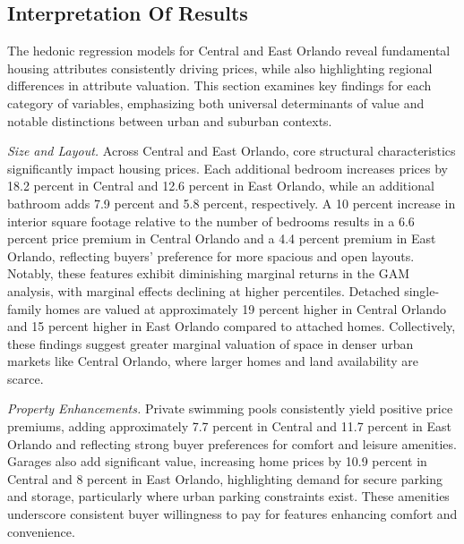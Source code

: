 




\subsection*{Interpretation Of Results}

The hedonic regression models for Central and East Orlando reveal fundamental housing attributes consistently driving prices, while also highlighting regional differences in attribute valuation. This section examines key findings for each category of variables, emphasizing both universal determinants of value and notable distinctions between urban and suburban contexts.

\textit{Size and Layout.}
Across Central and East Orlando, core structural characteristics significantly impact housing prices. Each additional bedroom increases prices by 18.2 percent  in Central and 12.6 percent in East Orlando, while an additional bathroom adds 7.9 percent and 5.8 percent, respectively. A 10 percent  increase in interior square footage relative to the number of bedrooms results in a 6.6 percent  price premium in Central Orlando and a 4.4 percent premium in East Orlando, reflecting buyers’ preference for more spacious and open layouts. Notably, these features exhibit diminishing marginal returns in the GAM analysis, with marginal effects declining at higher percentiles. Detached single-family homes are valued at approximately 19 percent higher in Central Orlando and 15 percent  higher in East Orlando compared to attached homes. Collectively, these findings suggest greater marginal valuation of space in denser urban markets like Central Orlando, where larger homes and land availability are scarce.

\textit{Property Enhancements.}
Private swimming pools consistently yield positive price premiums, adding approximately 7.7 percent in Central and 11.7 percent  in East Orlando and reflecting strong buyer preferences for comfort and leisure amenities. Garages also add significant value, increasing home prices by 10.9 percent in Central and 8 percent in East Orlando, highlighting demand for secure parking and storage, particularly where urban parking constraints exist. These amenities underscore consistent buyer willingness to pay for features enhancing comfort and convenience.

